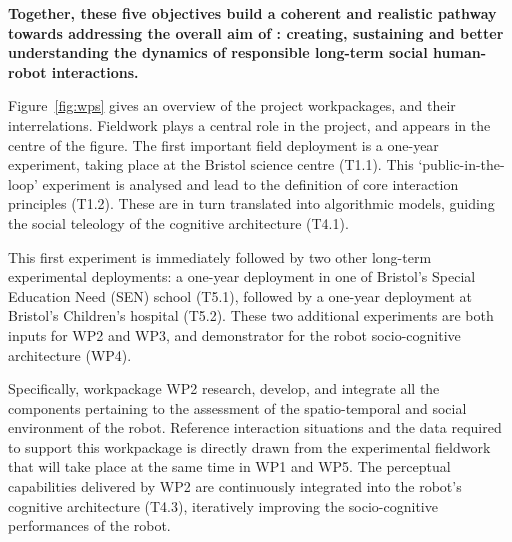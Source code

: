 \begin{framed}

\noindent\bf Together, these five objectives build a coherent and realistic pathway towards
addressing the overall aim of \project: creating, sustaining and better
understanding the dynamics of responsible long-term social human-robot
interactions.

\end{framed}




Figure~\ref{fig:wps} gives an overview of the project
workpackages, and their interrelations. Fieldwork plays a central role in the
project, and appears in the centre of the figure. The first important field
deployment is a one-year experiment, taking place at the Bristol science centre
(T1.1). This `public-in-the-loop' experiment is analysed and lead to the
definition of core interaction principles (T1.2). These are in turn translated
into algorithmic models, guiding the social teleology of the cognitive
architecture (T4.1).

This first experiment is immediately followed by two other long-term
experimental deployments: a one-year deployment in one of Bristol's Special
Education Need (SEN) school (T5.1), followed by a one-year deployment at
Bristol's Children's hospital (T5.2). These two additional experiments are both
inputs for WP2 and WP3, and demonstrator for the robot socio-cognitive
architecture (WP4).

Specifically, workpackage WP2 research, develop, and integrate all the components
pertaining to the assessment of the spatio-temporal and social environment of
the robot. Reference interaction situations and the data required to support
this workpackage is directly drawn from the experimental fieldwork that will
take place at the same time in WP1 and WP5. The perceptual capabilities
delivered by WP2 are continuously integrated into the robot's cognitive
architecture (T4.3), iteratively improving the socio-cognitive performances of
the robot.

